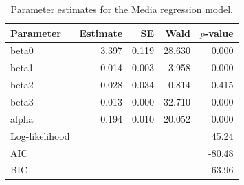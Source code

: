 \begin{table}[ht]
\centering
\caption{Parameter estimates for the Media regression model.}
\label{tab:media}
\begin{tabular}{lrrrr}
\toprule
Parameter & Estimate & SE & Wald & $p$-value\\
\midrule
beta0 & 3.397 & 0.119 & 28.630 & 0.000\\
beta1 & -0.014 & 0.003 & -3.958 & 0.000\\
beta2 & -0.028 & 0.034 & -0.814 & 0.415\\
beta3 & 0.013 & 0.000 & 32.710 & 0.000\\
alpha & 0.194 & 0.010 & 20.052 & 0.000\\
\midrule
Log-likelihood & \multicolumn{4}{r}{45.24}\\
AIC & \multicolumn{4}{r}{-80.48}\\
BIC & \multicolumn{4}{r}{-63.96}\\
\bottomrule
\end{tabular}
\end{table}
